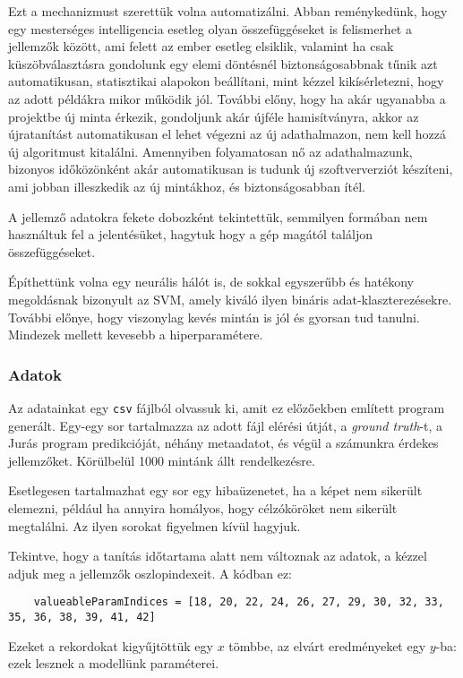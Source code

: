 Ezt a mechanizmust szerettük volna automatizálni. Abban reménykedünk, hogy egy 
mesterséges intelligencia esetleg olyan összefüggéseket is felismerhet a jellemzők
között, ami felett az ember esetleg elsiklik, valamint ha csak küszöbválasztásra
gondolunk egy elemi döntésnél biztonságosabbnak tűnik azt automatikusan, statisztikai
alapokon beállítani, mint kézzel kikísérletezni, hogy az adott példákra mikor működik jól.
További előny, hogy ha akár ugyanabba a projektbe új minta érkezik, gondoljunk akár újféle 
hamisítványra, akkor az újratanítást automatikusan el lehet végezni az új adathalmazon,
nem kell hozzá új algoritmust kitalálni. Amennyiben folyamatosan nő az adathalmazunk, 
bizonyos időközönként akár automatikusan is tudunk új szoftververziót készíteni,
ami jobban illeszkedik az új mintákhoz, és biztonságosabban ítél.


A jellemző adatokra fekete dobozként tekintettük, semmilyen formában nem használtuk fel
a jelentésüket, hagytuk hogy a gép magától találjon összefüggéseket.


Építhettünk volna egy neurális hálót is, de sokkal egyszerűbb és hatékony
megoldásnak bizonyult az SVM, amely kiváló ilyen bináris adat-klaszterezésekre.
További előnye, hogy viszonylag kevés mintán is jól és gyorsan tud tanulni.
Mindezek mellett kevesebb a hiperparamétere.


\subsubsection{Adatok}

Az adatainkat egy \texttt{csv} fájlból olvassuk ki, amit ez előzőekben említett program 
generált. Egy-egy sor tartalmazza az adott fájl elérési útját, a \textit{ground truth}-t,
a Jurás program predikcióját, néhány metaadatot, és végül a számunkra érdekes jellemzőket.
Körülbelül 1000 mintánk állt rendelkezésre.

Esetlegesen tartalmazhat egy sor egy hibaüzenetet, ha a képet nem sikerült elemezni, például 
ha annyira homályos, hogy célzóköröket nem sikerült megtalálni. Az ilyen sorokat figyelmen kívül hagyjuk.

Tekintve, hogy a tanítás időtartama alatt nem változnak az adatok, a kézzel adjuk
meg a jellemzők oszlopindexeit. A kódban ez:
\begin{lstlisting}  
	valueableParamIndices = [18, 20, 22, 24, 26, 27, 29, 30, 32, 33, 35, 36, 38, 39, 41, 42]
\end{lstlisting}

Ezeket a rekordokat kigyűjtöttük egy $ x $ tömbbe, az elvárt eredményeket egy $ y $-ba:
ezek lesznek a modellünk paraméterei.



